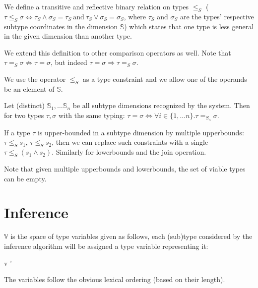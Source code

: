 \begin{defn}
    We define a transitive and reflective binary relation on types $\leq_S$ ($\tau \leq_S \sigma \iff \tau_S \wedge \sigma_S = \tau_S\ \mathrm{and}\ \tau_S \vee \sigma_S = \sigma_S$, where $\tau_S$ and $\sigma_S$ are the types' respective subtype coordinates in the dimension $\mathbb{S}$) which states that one type is less general in the given dimension than another type.

    We extend this definition to other comparison operators as well. Note that $\tau =_S \sigma \not\Rightarrow \tau = \sigma$, but indeed $\tau = \sigma \Rightarrow \tau =_S \sigma$.

    We use the operator $\leq_S$ as a type constraint and we allow one of the operands be an element of $\mathbb{S}$.
\end{defn}

\begin{lemma}
    Let (distinct) $\mathbb{S}_1, \dots \mathbb{S}_n$ be all subtype dimensions recognized by the system. Then for two types $\tau, \sigma$ with the same typing: $\tau = \sigma \iff \forall i \in \{1, \dots n\} . \tau =_{S_n} \sigma$. 
\end{lemma}

\begin{lemma}
    If a type $\tau$ is upper-bounded in a subtype dimension by multiple upperbounds: $\tau \leq_S s_1$, $\tau \leq_S s_2$, then we can replace such constraints with a single $\tau \leq_S (s_1 \wedge s_2)$. Similarly for lowerbounds and the join operation.

    Note that given multiple upperbounds and lowerbounds, the set of viable types can be empty. 
\end{lemma}

\section{Inference}

\begin{defn}
    $\mathbb{V}$ is the space of type variables given as follows, each (sub)type considered by the inference algorithm will be assigned a type variable representing it:
    \begin{grammar}{ \Rightarrow v}{}
        \mid {} '
    \end{grammar}

    The variables follow the obvious lexical ordering (based on their length).
\end{defn}

